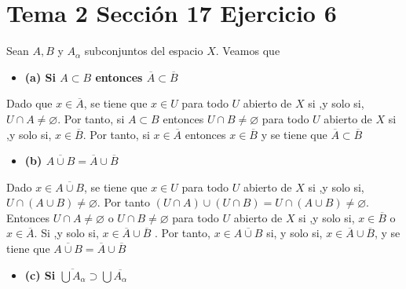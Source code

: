 \documentclass{article}
\begin{document}
\section{Tema 2 Sección 17 Ejercicio 6}
Sean $A, B$ y $A_{\alpha}$ subconjuntos del espacio $X$. Veamos que
\begin{itemize}
\item \bf (a) \rm  Si $A\subset B$ entonces $\overline{A}\subset\overline{B}$
\end{itemize}
Dado que $x\in \overline{A}$, se tiene que $x\in U$ para todo $U$ abierto de $X$ si ,y solo si, $U\cap A\neq\varnothing$. Por tanto, si $A\subset B$ entonces $U\cap B\neq\varnothing$ para todo $U$ abierto de $ X$ si ,y solo si, $x\in \overline{B}$. Por tanto, si $x\in \overline{A}$ entonces $x \in\overline{B}$ y se tiene que $\overline{A} \subset \overline{B}$

\begin{itemize}
\item \bf (b) \rm  $\overline{A\cup B}=\overline{A}\cup\overline{B}$
\end{itemize}
Dado $x\in \overline{A\cup B}$, se tiene que $x\in U$ para todo $U$ abierto de $X$ si ,y solo si, $U\cap (A \cup B)\neq\varnothing$. Por tanto $(U\cap A)\cup (U\cap B)=U\cap (A \cup B)\neq\varnothing$. Entonces $U\cap A\neq\varnothing$ o $U\cap B\neq\varnothing$ para todo $U$ abierto de $ X$ si ,y solo si, $x\in \overline{B}$ o $x\in \overline{A}$. Si ,y solo si, $x\in \overline{A}\cup\overline{B}$ . Por tanto, $x\in \overline{A\cup B}$ si, y solo si, $x \in\overline{A}\cup \overline{B}$, y se tiene que $\overline{A\cup B}=\overline{A} \cup \overline{B}$
\begin{itemize}
\item \bf (c) \rm  Si $\overline{\bigcup A_\alpha}\supset \bigcup\overline{A_\alpha}$
\end{itemize}
 
\end{document}
